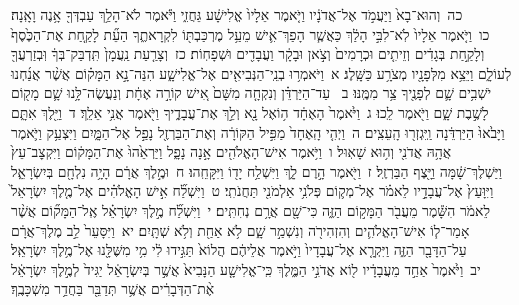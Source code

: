 \documentclass[18pt]{article}
\newcommand{\vart}[1]{\Bfootnote{#1}}	%
\newcommand{\kri}[1]{\Afootnote{#1}}	%
\begin{document}
 {\loc כה~}וְהוּא־בָא֙ וַיַּעֲמֹ֣ד אֶל־אֲדֹנָ֔יו וַיֹּ֤אמֶר אֵלָיו֙ אֱלִישָׁ֔ע  \edtext{(מאן)}{\kri{קרי: מֵאַ֖יִן}}  גֵּחֲזִ֑י וַיֹּ֕אמֶר לֹא־הָלַ֥ךְ עַבְדְּךָ֖ אָ֥נֶה וָאָֽנָה׃ \startlock
 {\loc כו~}וַיֹּ֤אמֶר אֵלָיו֙ לֹֽא־לִבִּ֣י הָלַ֔ךְ כַּאֲשֶׁ֧ר הָפַךְ־אִ֛ישׁ מֵעַ֥ל מֶרְכַּבְתּ֖וֹ לִקְרָאתֶ֑ךָ הַעֵ֞ת לָקַ֤חַת אֶת־הַכֶּ֙סֶף֙ וְלָקַ֣חַת בְּגָדִ֔ים וְזֵיתִ֤ים וּכְרָמִים֙ וְצֹ֣אן וּבָקָ֔ר וַעֲבָדִ֖ים וּשְׁפָחֽוֹת׃ \startlock
 {\loc כז~}וְצָרַ֤עַת נַֽעֲמָן֙ תִּֽדְבַּק־בְּךָ֔ וּֽבְזַרְעֲךָ֖ לְעוֹלָ֑ם וַיֵּצֵ֥א מִלְּפָנָ֖יו מְצֹרָ֥ע כַּשָּֽׁלֶג׃ 
\startlock
 {\loc א~}וַיֹּאמְר֥וּ בְנֵֽי־הַנְּבִיאִ֖ים אֶל־אֱלִישָׁ֑ע הִנֵּה־נָ֣א הַמָּק֗וֹם אֲשֶׁ֨ר אֲנַ֜חְנוּ יֹשְׁבִ֥ים שָׁ֛ם לְפָנֶ֖יךָ צַ֥ר מִמֶּֽנּוּ׃ \startlock
 {\loc ב~}\edtext{נֵלְכָה־נָּ֣א}{\vart{א=נֵלֲכָה־נָּ֣א | }}  עַד־הַיַּרְדֵּ֗ן וְנִקְחָ֤ה מִשָּׁם֙ אִ֚ישׁ קוֹרָ֣ה אֶחָ֔ת וְנַעֲשֶׂה־לָּ֥נוּ שָׁ֛ם מָק֖וֹם לָשֶׁ֣בֶת שָׁ֑ם וַיֹּ֖אמֶר לֵֽכוּ׃ \startlock
 {\loc ג~}וַיֹּ֙אמֶר֙ הָאֶחָ֔ד ה֥וֹאֶל נָ֖א וְלֵ֣ךְ אֶת־עֲבָדֶ֑יךָ וַיֹּ֖אמֶר אֲנִ֥י אֵלֵֽךְ׃ \startlock
 {\loc ד~}וַיֵּ֖לֶךְ אִתָּ֑ם וַיָּבֹ֙אוּ֙ הַיַּרְדֵּ֔נָה וַֽיִּגְזְר֖וּ הָֽעֵצִֽים׃ \startlock
 {\loc ה~}וַיְהִ֤י הָֽאֶחָד֙ מַפִּ֣יל הַקּוֹרָ֔ה וְאֶת־הַבַּרְזֶ֖ל נָפַ֣ל אֶל־הַמָּ֑יִם וַיִּצְעַ֥ק וַיֹּ֛אמֶר אֲהָ֥הּ אֲדֹנִ֖י וְה֥וּא שָׁאֽוּל׃ \startlock
 {\loc ו~}וַיֹּ֥אמֶר אִישׁ־הָאֱלֹהִ֖ים אָ֣נָה נָפָ֑ל וַיַּרְאֵ֙הוּ֙ אֶת־הַמָּק֔וֹם וַיִּקְצׇב־עֵץ֙ וַיַּשְׁלֶךְ־שָׁ֔מָּה וַיָּ֖צֶף הַבַּרְזֶֽל׃ \startlock
 {\loc ז~}וַיֹּ֖אמֶר הָ֣רֶם לָ֑ךְ וַיִּשְׁלַ֥ח יָד֖וֹ וַיִּקָּחֵֽהוּ׃ \startlock
 {\loc ח~}וּמֶ֣לֶךְ אֲרָ֔ם הָיָ֥ה נִלְחָ֖ם בְּיִשְׂרָאֵ֑ל וַיִּוָּעַץ֙ אֶל־עֲבָדָ֣יו לֵאמֹ֗ר אֶל־מְק֛וֹם פְּלֹנִ֥י אַלְמֹנִ֖י תַּחֲנֹתִֽי׃ \startlock
 {\loc ט~}וַיִּשְׁלַ֞ח אִ֣ישׁ הָאֱלֹהִ֗ים אֶל־מֶ֤לֶךְ יִשְׂרָאֵל֙ לֵאמֹ֔ר הִשָּׁ֕מֶר מֵעֲבֹ֖ר הַמָּק֣וֹם הַזֶּ֑ה כִּי־שָׁ֖ם אֲרָ֥ם נְחִתִּֽים׃ \startlock
 {\loc י~}וַיִּשְׁלַ֞ח מֶ֣לֶךְ יִשְׂרָאֵ֗ל אֶֽל־הַמָּק֞וֹם אֲשֶׁ֨ר אָמַר־ל֧וֹ אִישׁ־הָאֱלֹהִ֛ים וְהִזְהִירֹ֖ה וְנִשְׁמַ֣ר שָׁ֑ם לֹ֥א אַחַ֖ת וְלֹ֥א שְׁתָּֽיִם׃ \startlock
 {\loc יא~}וַיִּסָּעֵר֙ לֵ֣ב מֶלֶךְ־אֲרָ֔ם עַל־הַדָּבָ֖ר הַזֶּ֑ה וַיִּקְרָ֤א אֶל־עֲבָדָיו֙ וַיֹּ֣אמֶר אֲלֵיהֶ֔ם הֲלוֹא֙ תַּגִּ֣ידוּ לִ֔י מִ֥י מִשֶּׁלָּ֖נוּ אֶל־מֶ֥לֶךְ יִשְׂרָאֵֽל׃ \startlock
 {\loc יב~}וַיֹּ֙אמֶר֙ אַחַ֣ד מֵעֲבָדָ֔יו ל֖וֹא אֲדֹנִ֣י הַמֶּ֑לֶךְ כִּֽי־אֱלִישָׁ֤ע הַנָּבִיא֙ אֲשֶׁ֣ר בְּיִשְׂרָאֵ֔ל יַגִּיד֙ לְמֶ֣לֶךְ יִשְׂרָאֵ֔ל אֶ֨ת־הַדְּבָרִ֔ים אֲשֶׁ֥ר תְּדַבֵּ֖ר בַּחֲדַ֥ר מִשְׁכָּבֶֽךָ׃ \startlock
\end{document}

